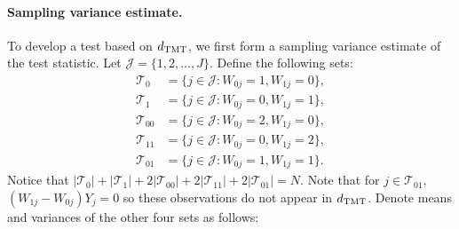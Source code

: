 \documentclass[12pt]{extarticle}
\newcommand{\tmt}{{\normalfont \text{TMT}}}
\newcommand{\cJ}{\mathcal{J}}
\newcommand{\cT}{\mathcal{T}}
\begin{document}
\paragraph{Sampling variance estimate.} To develop a test based on $d_{\tmt}$, we first form a sampling variance estimate of the test statistic. Let $\cJ = \{1, 2, \ldots, J\}$. Define the following sets: 
{\allowdisplaybreaks
\begin{align*}
\cT_0 &= \{j\in \cJ: W_{0j}=1,W_{1j}=0\}, \nonumber \\
\cT_1 &= \{j\in \cJ: W_{0j}=0,W_{1j}=1\}, \nonumber \\
\cT_{00} &= \{j \in \cJ: W_{0j}=2, W_{1j}=0\}, \nonumber \\
\cT_{11} &= \{j \in \cJ: W_{0j}=0, W_{1j}=2\}, \nonumber \\
\cT_{01} &= \{j \in \cJ: W_{0j}=1, W_{1j}=1\}.
\end{align*}}Notice that $|\cT_0| + |\cT_1| + 2|\cT_{00}| + 2|\cT_{11}| + 2|\cT_{01}| = N$. Note that for $j\in \cT_{01}$, $(W_{1j}-W_{0j})Y_j=0$ so these observations do not appear in $d_{\tmt}$. Denote means and variances of the other four sets as follows: 
\end{document}
